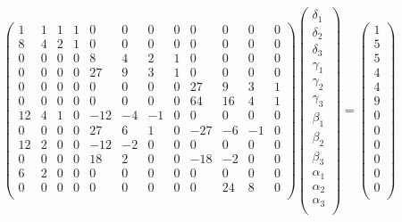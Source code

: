 \documentclass[varwidth,12pt,a4paper]{article}
\begin{document}
$$
\left( \begin{array}{cccccccccccc}
     1  &  1  &  1  &  1 &   0&    0&    0 &   0&    0&    0&    0&    0 \\
     8  &  4  &  2  &  1 &   0&    0&    0 &   0&    0&    0&    0&    0 \\
     0  &  0  &  0  &  0 &   8&    4&    2 &   1&    0&    0&    0&    0 \\
     0  &  0  &  0  &  0 &  27&    9&    3 &   1&    0&    0&    0&    0 \\
     0  &  0  &  0  &  0 &   0&    0&    0 &   0&   27&    9&    3&    1 \\
     0  &  0  &  0  &  0 &   0&    0&    0 &   0&   64&   16&    4&    1 \\
    12  &  4  &  1  &  0 & -12&   -4&   -1 &   0&    0&    0&    0&    0 \\
     0  &  0  &  0  &  0 &  27&    6&    1 &   0&  -27&   -6&   -1&    0 \\
    12  &  2  &  0  &  0 & -12&   -2&    0 &   0&    0&    0&    0&    0 \\
     0  &  0  &  0  &  0 &  18&    2&    0 &   0&  -18&   -2&    0&    0 \\
     6  &  2  &  0  &  0 &   0&    0&    0 &   0&    0&    0&    0&    0 \\
     0  &  0  &  0  &  0 &   0&    0&    0 &   0&    0&   24&    8&    0 \\
\end{array} \right) \left( \begin{array}{c}
\delta _1\\
\delta_2\\
\delta_3\\
\gamma _1\\
\gamma _2\\
\gamma_3\\
\beta _1\\
\beta _2\\
\beta _3\\
\alpha _1\\
\alpha _2\\
\alpha _3 \\
\end{array} \right) = \left( \begin{array}{c}
1 \\
5 \\
5 \\
4 \\
4 \\
9 \\
0 \\
0 \\
0 \\
0 \\
0 \\
0 \\
\end{array} \right) 
$$
\end{document}
